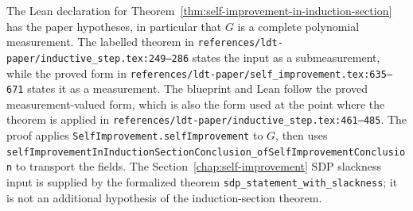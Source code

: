 \begin{remark}\label{rem:self-improvement-in-induction-section-realization}
	The Lean declaration for
	Theorem~\ref{thm:self-improvement-in-induction-section} has the paper
	hypotheses, in particular that \(G\) is a complete polynomial measurement.
	The labelled theorem in
	\texttt{references/ldt-paper/inductive\_step.tex:249--286} states the input
	as a submeasurement, while the proved form in
	\texttt{references/ldt-paper/self\_improvement.tex:635--671} states it as a
	measurement.  The blueprint and Lean follow the proved measurement-valued
	form, which is also the form used at the point where the theorem is applied
	in \texttt{references/ldt-paper/inductive\_step.tex:461--485}.
	The proof applies
	\texttt{SelfImprovement.selfImprovement} to \(G\), then uses
	\texttt{selfImprovementInInductionSectionConclusion\_ofSelfImprovementConclusion}
	to transport the fields.  The Section~\ref{chap:self-improvement} SDP
	slackness input is supplied by the formalized theorem
	\texttt{sdp\_statement\_with\_slackness}; it is not an additional hypothesis of
	the induction-section theorem.
\end{remark}

